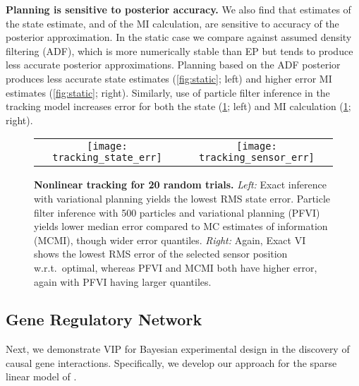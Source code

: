 \textbf{Planning is sensitive to posterior accuracy.}  We also find
that estimates of the state estimate, and of the MI calculation, are
sensitive to accuracy of the posterior approximation.  In the static
case we compare against assumed density filtering (ADF), which is more
numerically stable than EP but tends to produce less accurate
posterior approximations.  Planning based on the ADF posterior
produces less accurate state estimates (\FIG\ref{fig:static}; left)
and higher error MI estimates (\FIG\ref{fig:static}; right).
Similarly, use of particle filter inference in the tracking model
increases error for both the state (\FIG\ref{fig:dynamic}; left) and
MI calculation (\FIG\ref{fig:dynamic}; right).



\begin{figure}[t]
  \begin{tabular}{cc}
    \hspace{-3mm}\texttt{[image: tracking\_state\_err]} &
    \hspace{-3mm}\texttt{[image: tracking\_sensor\_err]}
  \end{tabular}
  
  \caption{\small\textbf{Nonlinear tracking for 20 random
  trials.}  \emph{Left:} Exact inference with variational planning
  yields the lowest RMS state error.  Particle filter inference with
  500 particles and variational planning (PFVI) yields lower median
  error compared to MC estimates of information (MCMI), though wider
  error quantiles.  \emph{Right:} Again, Exact VI shows the lowest RMS
  error of the selected sensor position w.r.t.~optimal, whereas PFVI
  and MCMI both have higher error, again with PFVI having larger
  quantiles.}
  \label{fig:dynamic}
\end{figure}





\subsection{Gene Regulatory Network}

Next, we demonstrate VIP for Bayesian experimental design in the
discovery of causal gene interactions.  Specifically, we develop our
approach for the sparse linear model of \cite{steinke2007experimental,
  seeger2008bayesian}.

